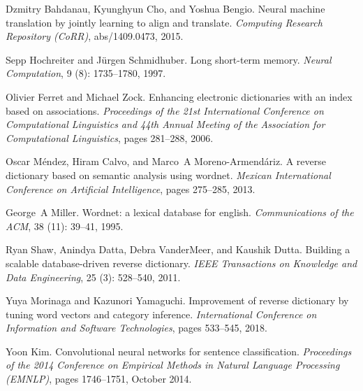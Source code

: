\documentclass{article}
\begin{document}
\begin{thebibliography}{45}
Dzmitry Bahdanau, Kyunghyun Cho, and Yoshua Bengio.
\newblock Neural machine translation by jointly learning to align and
  translate.
\newblock \emph{Computing Research Repository (CoRR)}, abs/1409.0473, 2015.

Sepp Hochreiter and J{\"u}rgen Schmidhuber.
\newblock Long short-term memory.
\newblock \emph{Neural Computation}, 9 (8): 1735--1780, 1997.

Olivier Ferret and Michael Zock.
\newblock Enhancing electronic dictionaries with an index based on
  associations.
\newblock \emph{Proceedings of the 21st International Conference on
  Computational Linguistics and 44th Annual Meeting of the Association for
  Computational Linguistics}, pages 281--288, 2006.

Oscar M{\'e}ndez, Hiram Calvo, and Marco~A Moreno-Armend{\'a}riz.
\newblock A reverse dictionary based on semantic analysis using wordnet.
\newblock \emph{Mexican International Conference on Artificial Intelligence},
  pages 275--285, 2013.

George~A Miller.
\newblock Wordnet: a lexical database for english.
\newblock \emph{Communications of the ACM}, 38 (11): 39--41,
  1995.

Ryan Shaw, Anindya Datta, Debra VanderMeer, and Kaushik Dutta.
\newblock Building a scalable database-driven reverse dictionary.
\newblock \emph{IEEE Transactions on Knowledge and Data Engineering},
  25 (3): 528--540, 2011.

Yuya Morinaga and Kazunori Yamaguchi.
\newblock Improvement of reverse dictionary by tuning word vectors and category
  inference.
\newblock \emph{International Conference on Information and Software
  Technologies}, pages 533--545, 2018.

Yoon Kim.
\newblock Convolutional neural networks for sentence classification.
\newblock \emph{Proceedings of the 2014 Conference on Empirical Methods in
  Natural Language Processing ({EMNLP})}, pages 1746--1751, October 2014.


\end{thebibliography}
\end{document}
